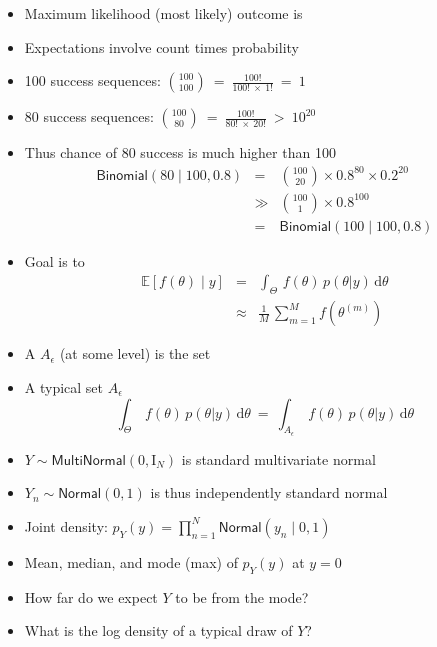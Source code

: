 \documentclass[10pt]{report}
\begin{document}
%
\begin{itemize}
\item Maximum likelihood (most likely) outcome is 
\item Expectations involve count times probability
\item 100 success sequences:
$\binom{100}{100} \ = \ \frac{100!}{100! \ \times \ 1!} \ = \ 1$
\item 80 success sequences:
$\binom{100}{80} \ = \ \frac{100!}{80! \ \times \ 20!} \ > \ 10^{20}$
\item Thus chance of 80 success is much higher than 100
\begin{eqnarray*}
\mathsf{Binomial}(80 \mid 100, 0.8)
& = &
  \textstyle \binom{100}{20} \times 0.8^{80} \times 0.2^{20}
\\[4pt]
& \gg &
\textstyle \binom{100}{1} \times 0.8^{100}
\\[4pt]
& = &
\mathsf{Binomial}(100 \mid 100, 0.8)
\end{eqnarray*}
\end{itemize}


%
\begin{itemize}
\item Goal is to 
\begin{eqnarray*}
\mathbb{E}\left[ f(\theta) \mid y \right]
& = & \int_{\Theta} \, f(\theta) \, p(\theta | y) \, \mathrm{d}\theta
\\[4pt]
& \approx & \frac{1}{M} \, \sum_{m=1}^M f(\theta^{(m)})
\end{eqnarray*}
\item A  $A_{\epsilon}$ (at some level) is the set
\item A typical set $A_{\epsilon}$ 
\[
\int_{\Theta} \, f(\theta) \, p(\theta | y) \, \mathrm{d}\theta
\ = \
\int_{A_{\epsilon}} \, f(\theta) \, p(\theta | y) \, \mathrm{d}\theta
\]
\end{itemize}


%
\begin{itemize}
\item $Y \sim \mathsf{MultiNormal}(0, \mathrm{I}_N)$ is
  standard multivariate normal
\item $Y_n \sim \mathsf{Normal}(0, 1)$ is thus independently standard normal
\item Joint density:  $p_Y(y) = \prod_{n=1}^N \mathsf{Normal}(y_n \mid 0, 1)$
\item Mean, median, and mode (max) of $p_Y(y)$ at $y = 0$
\vfill
\item How far do we expect $Y$ to be from the mode?
\item What is the log density of a typical draw of $Y$?
\end{itemize}
\end{document}
